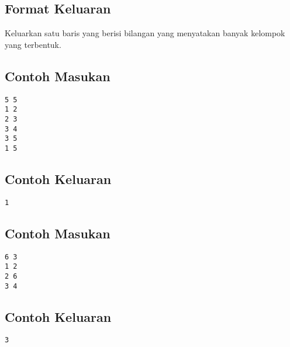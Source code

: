 \documentclass{article}
\begin{document}
\subsection*{Format Keluaran}

Keluarkan satu baris yang berisi bilangan yang menyatakan banyak kelompok yang terbentuk.

\newline
\begin{multicols}{2}
\subsection*{Contoh Masukan}
\begin{lstlisting}
5 5
1 2
2 3
3 4
3 5
1 5
\end{lstlisting}
\columnbreak
\subsection*{Contoh Keluaran}
\begin{lstlisting}
1
\end{lstlisting}
\vfill
\null
\end{multicols}

\begin{multicols}{2}
\subsection*{Contoh Masukan}
\begin{lstlisting}
6 3
1 2
2 6
3 4
\end{lstlisting}
\columnbreak
\subsection*{Contoh Keluaran}
\begin{lstlisting}
3
\end{lstlisting}
\vfill
\null
\end{multicols}


\pagebreak
\end{document}

